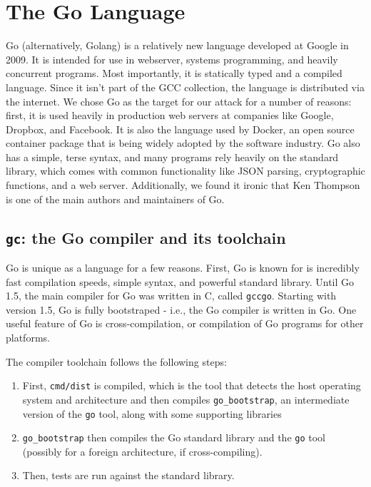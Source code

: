 \documentclass[10pt]{sigplanconf}
\begin{document}
\section{The Go Language}
Go (alternatively, Golang) is a relatively new language developed at Google in 2009. It is intended for use in webserver, systems programming, and heavily concurrent programs. Most importantly, it is statically typed and a compiled language. Since it isn't part of the GCC collection, the language is distributed via the internet. We chose Go as the target for our attack for a number of reasons: first, it is used heavily in production web servers at companies like Google, Dropbox, and Facebook. It is also the language used by Docker, an open source container package that is being widely adopted by the software industry. Go also has a simple, terse syntax, and many programs rely heavily on the standard library, which comes with common functionality like JSON parsing, cryptographic functions, and a web server. Additionally, we found it ironic that Ken Thompson is one of the main authors and maintainers of Go.

\subsection{\texttt{gc}: the Go compiler and its toolchain}
Go is unique as a language for a few reasons. First, Go is known for is incredibly fast compilation speeds, simple syntax, and powerful standard library. Until Go 1.5, the main compiler for Go was written in C, called \texttt{gccgo}. Starting with version 1.5, Go is fully bootstraped - i.e., the Go compiler is written in Go. One useful feature of Go is cross-compilation, or compilation of Go programs for other platforms.

\smallskip
The compiler toolchain follows the following steps: 
\begin{enumerate}
	\item First, \texttt{cmd/dist} is compiled, which is the tool that detects the host operating system and architecture and then compiles \texttt{go\_bootstrap}, an intermediate version of the \texttt{go} tool, along with some supporting libraries
	\item \texttt{go\_bootstrap} then compiles the Go standard library and the \texttt{go} tool (possibly for a foreign architecture, if cross-compiling). 
	\item Then, tests are run against the standard library.  
\end{enumerate}
\end{document}
